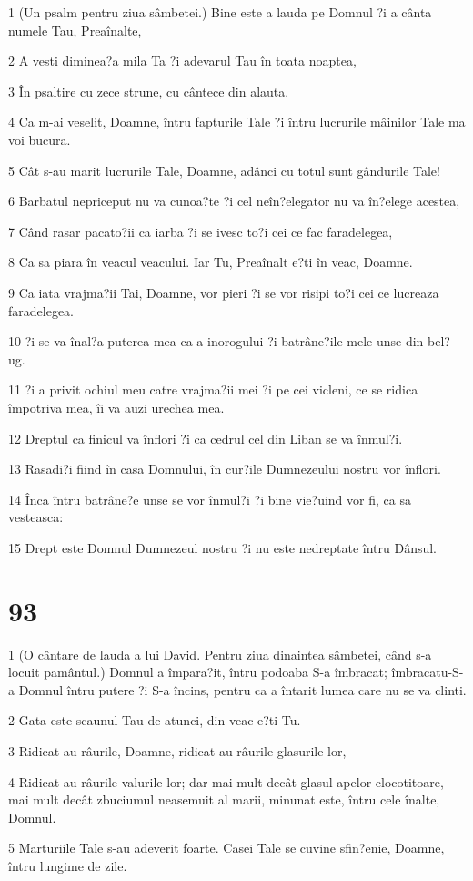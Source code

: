 \par 1 (Un psalm pentru ziua sâmbetei.) Bine este a lauda pe Domnul ?i a cânta numele Tau, Preaînalte,
\par 2 A vesti diminea?a mila Ta ?i adevarul Tau în toata noaptea,
\par 3 În psaltire cu zece strune, cu cântece din alauta.
\par 4 Ca m-ai veselit, Doamne, întru fapturile Tale ?i întru lucrurile mâinilor Tale ma voi bucura.
\par 5 Cât s-au marit lucrurile Tale, Doamne, adânci cu totul sunt gândurile Tale!
\par 6 Barbatul nepriceput nu va cunoa?te ?i cel neîn?elegator nu va în?elege acestea,
\par 7 Când rasar pacato?ii ca iarba ?i se ivesc to?i cei ce fac faradelegea,
\par 8 Ca sa piara în veacul veacului. Iar Tu, Preaînalt e?ti în veac, Doamne.
\par 9 Ca iata vrajma?ii Tai, Doamne, vor pieri ?i se vor risipi to?i cei ce lucreaza faradelegea.
\par 10 ?i se va înal?a puterea mea ca a inorogului ?i batrâne?ile mele unse din bel?ug.
\par 11 ?i a privit ochiul meu catre vrajma?ii mei ?i pe cei vicleni, ce se ridica împotriva mea, îi va auzi urechea mea.
\par 12 Dreptul ca finicul va înflori ?i ca cedrul cel din Liban se va înmul?i.
\par 13 Rasadi?i fiind în casa Domnului, în cur?ile Dumnezeului nostru vor înflori.
\par 14 Înca întru batrâne?e unse se vor înmul?i ?i bine vie?uind vor fi, ca sa vesteasca:
\par 15 Drept este Domnul Dumnezeul nostru ?i nu este nedreptate întru Dânsul.

\chapter{93}

\par 1 (O cântare de lauda a lui David. Pentru ziua dinaintea sâmbetei, când s-a locuit pamântul.) Domnul a împara?it, întru podoaba S-a îmbracat; îmbracatu-S-a Domnul întru putere ?i S-a încins, pentru ca a întarit lumea care nu se va clinti.
\par 2 Gata este scaunul Tau de atunci, din veac e?ti Tu.
\par 3 Ridicat-au râurile, Doamne, ridicat-au râurile glasurile lor,
\par 4 Ridicat-au râurile valurile lor; dar mai mult decât glasul apelor clocotitoare, mai mult decât zbuciumul neasemuit al marii, minunat este, întru cele înalte, Domnul.
\par 5 Marturiile Tale s-au adeverit foarte. Casei Tale se cuvine sfin?enie, Doamne, întru lungime de zile.

